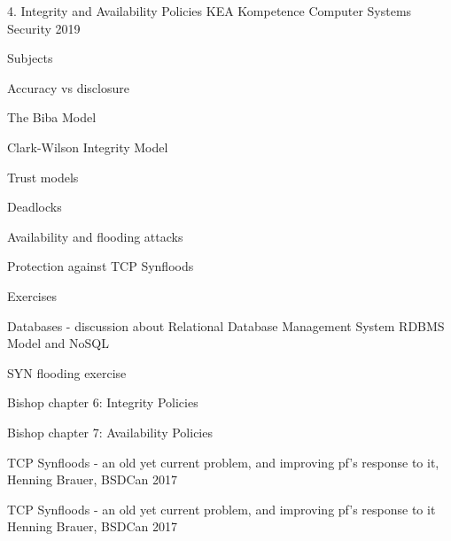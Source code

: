 \documentclass[Screen16to9,17pt]{foils}
\begin{document}
\mytitlepage
{4. Integrity and Availability Policies}
{KEA Kompetence Computer Systems Security 2019}



\begin{list1}
\item Subjects
\begin{list2}
\item Accuracy vs disclosure
\item The Biba Model
\item Clark-Wilson Integrity Model
\item Trust models
\item Deadlocks
\item Availability and flooding attacks
\item Protection against TCP Synfloods
\end{list2}
\item Exercises
\begin{list2}
\item Databases - discussion about Relational Database Management System RDBMS Model and NoSQL
\item SYN flooding exercise
\end{list2}
\end{list1}




\begin{list1}
\item Bishop chapter 6: Integrity Policies
\item Bishop chapter 7: Availability Policies
\item TCP Synfloods - an old yet current problem, and improving pf's response to it, Henning Brauer, BSDCan 2017
\end{list1}















TCP Synfloods - an old yet current problem, and improving pf's response to it
Henning Brauer, BSDCan 2017






\slidenext
\end{document}
